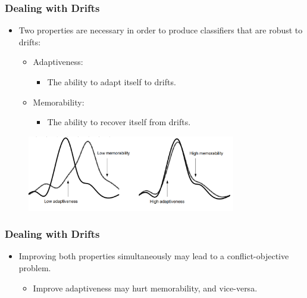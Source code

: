 \documentclass[14pt]{beamer}
\begin{document}
\begin{frame}\frametitle{Dealing with Drifts}

\begin{itemize}
\item Two properties are necessary in order to produce classifiers that are robust to drifts:
\begin{itemize}
\item Adaptiveness:
\begin{itemize}
\item The ability to adapt itself to drifts.
\end{itemize}
\item Memorability:
\begin{itemize}
\item The ability to recover itself from drifts.
\end{itemize}
\end{itemize}
\end{itemize}

\begin{figure}
\centering
\includegraphics[height=1.30in]{drift3}
\end{figure}
\end{frame}

\begin{frame}\frametitle{Dealing with Drifts}

\begin{itemize}
\item Improving both properties simultaneously may lead to a conflict-objective problem.
\begin{itemize}
\item Improve adaptiveness may hurt memorability, and vice-versa.
\end{itemize}
\end{itemize}

\end{frame}
\end{document}
